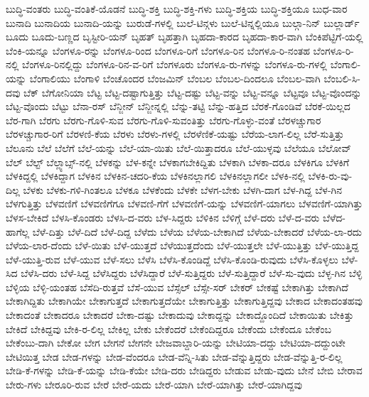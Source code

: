 {ಬುದ್ಧಿ-ವಂತರು
ಬುದ್ಧಿ-ವಂತಿಕೆ-ಯೊಡನೆ
ಬುದ್ಧಿ-ಶಕ್ತಿ
ಬುದ್ಧಿ-ಶಕ್ತಿ-ಗಳು
ಬುದ್ಧಿ-ಶಕ್ತಿಯ
ಬುದ್ಧಿ-ಶಕ್ತಿಯೂ
ಬುಧ-ವಾರ
ಬುನಾದಿ
ಬುನಾದಿಯ
ಬುನಾದಿ-ಯನ್ನು
ಬುರುಡೆ-ಗಳಲ್ಲಿ
ಬುಲೆ-ಟಿನ್ಗಳು
ಬುಲೆ-ಟಿನ್ನಲ್ಲಿಯೂ
ಬುಲ್ಗಾ-ನಿನ್
ಬುಲ್ಲಾರ್ಡ್
ಬೂದು
ಬೂದು-ಬಣ್ಣದ
ಬೃಸ್ಟೀರಿ-ಯನ್
ಬೃಹತ್
ಬೃಹತ್ತಾಗಿ
ಬೃಹದಾ-ಕಾರದ
ಬೃಹದಾ-ಕಾರ-ವಾಗಿ
ಬೆಂಕಿಪೆಟ್ಟಿಗೆ-ಯಲ್ಲಿ
ಬೆಂಕಿ-ಯನ್ನೂ
ಬೆಂಗಳೂ-ರನ್ನು
ಬೆಂಗಳೂ-ರಿಂದ
ಬೆಂಗಳೂ-ರಿಗೆ
ಬೆಂಗಳೂ-ರಿನ
ಬೆಂಗಳೂ-ರಿ-ನಂತಹ
ಬೆಂಗಳೂ-ರಿ-ನಲ್ಲಿ
ಬೆಂಗಳೂ-ರಿನಲ್ಲಿದ್ದು
ಬೆಂಗಳೂ-ರಿನ-ವ-ರಿಗೆ
ಬೆಂಗಳೂರು
ಬೆಂಗಳೂ-ರು-ಗಳನ್ನು
ಬೆಂಗಳೂ-ರು-ಗಳಲ್ಲಿ
ಬೆಂಗಾಲಿ-ಯನ್ನು
ಬೆಂಗಾಲಿಯು
ಬೆಂಗಾಳಿ
ಬೆಂಚೊಂದರ
ಬೆಂಜಮಿನ್
ಬೆಂಬಲ
ಬೆಂಬಲ-ದಿಂದಲೂ
ಬೆಂಬಲ-ವಾಗಿ
ಬೆಂಬಲಿ-ಸಿ-ದವು
ಬೆಕ್
ಬೆಗೋನಿಯಾ
ಬೆಟ್ಟ
ಬೆಟ್ಟ-ದಷ್ಟಾಗುತ್ತಿತ್ತು
ಬೆಟ್ಟ-ದಷ್ಟು
ಬೆಟ್ಟ-ವನ್ನು
ಬೆಟ್ಟ-ವನ್ನೂ
ಬೆಟ್ಟವೂ
ಬೆಟ್ಟ-ವೊಂದನ್ನು
ಬೆಟ್ಟ-ವೊಂದು
ಬೆಟ್ಟು
ಬೆನಾ-ರಸ್
ಬೆನ್ಜೀನ್
ಬೆನ್ಜೀನ್ನಲ್ಲಿ
ಬೆನ್ನು-ತಟ್ಟಿ
ಬೆನ್ನು-ಹತ್ತಿದ
ಬೆರಕೆ-ಗೊಂಡಿವೆ
ಬೆರಕೆ-ಯಿಲ್ಲದ
ಬೆರ-ಗಾಗಿ
ಬೆರಗು
ಬೆರಗು-ಗೊಳಿ-ಸುವ
ಬೆರಗು-ಗೊಳಿ-ಸುವಂತಿತ್ತು
ಬೆರಗು-ಗೊಳ್ಳು-ವಂತೆ
ಬೆರಳಚ್ಚುಗಾರ
ಬೆರಳಚ್ಚುಗಾರ-ರಿಗೆ
ಬೆರಳಣಿ-ಕೆಯ
ಬೆರಳು
ಬೆರಳು-ಗಳಲ್ಲಿ
ಬೆರಳೆಣಿಕೆ-ಯಷ್ಟು
ಬೆರೆಯ-ಲಾಗ-ಲಿಲ್ಲ
ಬೆರೆ-ಸುತ್ತಿತ್ತು
ಬೆಲೂನು
ಬೆಲೆ
ಬೆಲೆಗೆ
ಬೆಲೆ-ಯನ್ನು
ಬೆಲೆ-ಯಾ-ಯಿತು
ಬೆಲೆ-ಯಿತ್ತಾದರೂ
ಬೆಲೆ-ಯುಳ್ಳವು
ಬೆಲೆಯೂ
ಬೆಲೋವ್
ಬೆಲ್
ಬೆಲ್ಟ್
ಬೆಲ್ಲ್ಯಾಬ್ಸ್-ನಲ್ಲಿ
ಬೆಳಕನ್ನು
ಬೆಳ-ಕನ್ನೇ
ಬೆಳಕಾಗಬೇಕಿದ್ದಿತು
ಬೆಳಕಾಗಿ
ಬೆಳಕಾ-ದರೂ
ಬೆಳಕಿಗೂ
ಬೆಳಕಿಗೆ
ಬೆಳಕಿದ್ದಲ್ಲಿ
ಬೆಳಕಿದ್ದಾಗ
ಬೆಳಕಿನ
ಬೆಳಕಿನ-ಚದರಿ-ಕೆಯ
ಬೆಳಕಿನಲ್ಲಾಗಲಿ
ಬೆಳಕಿನಲ್ಲಾಗಲೀ
ಬೆಳಕಿ-ನಲ್ಲಿ
ಬೆಳಕಿ-ರು-ವು-ದಿಲ್ಲ
ಬೆಳಕು
ಬೆಳಕು-ಗಳಿ-ಗಿಂತಲೂ
ಬೆಳಕೂ
ಬೆಳಕೆಂದು
ಬೆಳಕೇ
ಬೆಳಗ-ಬೇಕು
ಬೆಳಗಿ-ದಾಗ
ಬೆಳ-ಗಿದ್ದ
ಬೆಳ-ಗಿನ
ಬೆಳಗುತ್ತಿತ್ತು
ಬೆಳವಣಿಗೆ
ಬೆಳವಣಿಗೆಗೂ
ಬೆಳವಣಿ-ಗೆಗೆ
ಬೆಳವಣಿಗೆ-ಯನ್ನು
ಬೆಳವಣಿಗೆ-ಯಾಗಲು
ಬೆಳವಣಿಗೆ-ಯಾಗಿತ್ತು
ಬೆಳಸ-ಬೇಕಿದೆ
ಬೆಳಸಿ-ಕೊಂಡರು
ಬೆಳಸಿ-ದ-ವರು
ಬೆಳ-ಸಿದ್ದರು
ಬೆಳಿಕಿನ
ಬೆಳಿಗ್ಗೆ
ಬೆಳೆ-ದರು
ಬೆಳೆ-ದ-ವರು
ಬೆಳೆದ-ಹಾಗೆಲ್ಲ
ಬೆಳೆ-ದಿತ್ತು
ಬೆಳೆ-ದಿದೆ
ಬೆಳೆ-ದಿದ್ದ
ಬೆಳೆದು
ಬೆಳೆಯ
ಬೆಳೆಯ-ಬೇಕಾಗಿದೆ
ಬೆಳೆಯ-ಬೇಕಾದರೆ
ಬೆಳೆಯ-ಲಾ-ರದು
ಬೆಳೆಯ-ಲಾರ-ದೆಂದು
ಬೆಳೆ-ಯಿತು
ಬೆಳೆ-ಯುತ್ತದೆ
ಬೆಳೆಯುತ್ತದೆಂದು
ಬೆಳೆ-ಯುತ್ತಲೇ
ಬೆಳೆ-ಯುತ್ತಿತ್ತು
ಬೆಳೆ-ಯುತ್ತಿದ್ದ
ಬೆಳೆ-ಯುತ್ತಿ-ರುವ
ಬೆಳೆ-ಯುವ
ಬೆಳೆ-ಸಲು
ಬೆಳೆಸಿ
ಬೆಳೆಸಿ-ಕೊಂಡಿದ್ದೆ
ಬೆಳೆಸಿ-ಕೊಂಡಿ-ರುವುದು
ಬೆಳೆಸಿ-ಕೊಳ್ಳಲು
ಬೆಳೆ-ಸಿದ
ಬೆಳೆಸಿ-ದರು
ಬೆಳೆ-ಸಿದ್ದ
ಬೆಳೆಸಿದ್ದರು
ಬೆಳೆಸಿದ್ದಾರೆ
ಬೆಳೆ-ಸುತ್ತಿದ್ದರು
ಬೆಳೆ-ಸುತ್ತಿದ್ದಾರೆ
ಬೆಳೆ-ಸು-ವುದು
ಬೆಳ್ಳ-ಗಿನ
ಬೆಳ್ಳಿ
ಬೆಳ್ಳಿಯ
ಬೆಳ್ಳಿ-ಯಂತಹ
ಬೆಸೆದಿ-ರುತ್ತವೆ
ಬೆಸೆ-ಯುವ
ಬೆಸ್ಸೆಲ್
ಬೆಸ್ಸೇ-ಸರ್
ಬೇಕರ್
ಬೇಕಷ್ಟೆ
ಬೇಕಾಗಿತ್ತು
ಬೇಕಾಗಿದೆ
ಬೇಕಾಗಿದ್ದಿತು
ಬೇಕಾಗಿಯೇ
ಬೇಕಾಗುತ್ತದೆ
ಬೇಕಾಗುತ್ತದೆಯೇ
ಬೇಕಾಗುತ್ತಿತ್ತು
ಬೇಕಾಗುತ್ತಿದ್ದವು
ಬೇಕಾದ
ಬೇಕಾದಂತಹವು
ಬೇಕಾದಂತೆ
ಬೇಕಾದರೂ
ಬೇಕಾದರೆ
ಬೇಕಾ-ದಷ್ಟು
ಬೇಕಾದುವು
ಬೇಕಾದ್ದನ್ನು
ಬೇಕಾದ್ದೊಂದಿದೆ
ಬೇಕಾಯಿತು
ಬೇಕಿತ್ತು
ಬೇಕಿದೆ
ಬೇಕಿದ್ದವು
ಬೇಕಿ-ರ-ಲಿಲ್ಲ
ಬೇಕಿಲ್ಲ
ಬೇಕು
ಬೇಕೆಂದರೆ
ಬೇಕೆಂದಿದ್ದರೂ
ಬೇಕೆಂದು
ಬೇಕೆಂದೂ
ಬೇಕೆಂಬ
ಬೇಕೆಂಬು-ದಾಗಿ
ಬೇಕೋ
ಬೇಗ
ಬೇಗನೆ
ಬೇಗನೇ
ಬೇಜವಾಬ್ದಾರಿ-ಯನ್ನು
ಬೇಟಿಯಾ-ದದ್ದು
ಬೇಟಿಯಾ-ದದ್ದುಂಟೇ
ಬೇಟಿಯಿತ್ತ
ಬೇಡ
ಬೇಡ-ಗಳನ್ನು
ಬೇಡ-ವೆಂದರೂ
ಬೇಡ-ವೆನ್ನಿ-ಸಿತು
ಬೇಡ-ವೆನ್ನುತ್ತಿದ್ದರು
ಬೇಡ-ವೆನ್ನುತ್ತಿ-ರ-ಲಿಲ್ಲ
ಬೇಡಿ-ಕೆ-ಗಳನ್ನು
ಬೇಡಿ-ಕೆ-ಯನ್ನು
ಬೇಡಿ-ಕೆಯೇ
ಬೇಡಿ-ದರು
ಬೇಡಿದ್ದರು
ಬೇಡುವ
ಬೇಡು-ವುದು
ಬೇನೆ
ಬೇಬಿ
ಬೇರಾವ
ಬೇರು-ಗಳು
ಬೇರೂರಿ-ರುವ
ಬೇರೆ
ಬೇರೆ-ಯದು
ಬೇರೆ-ಯಾಗಿ
ಬೇರೆ-ಯಾಗಿತ್ತು
ಬೇರೆ-ಯಾಗಿದ್ದವು
}
